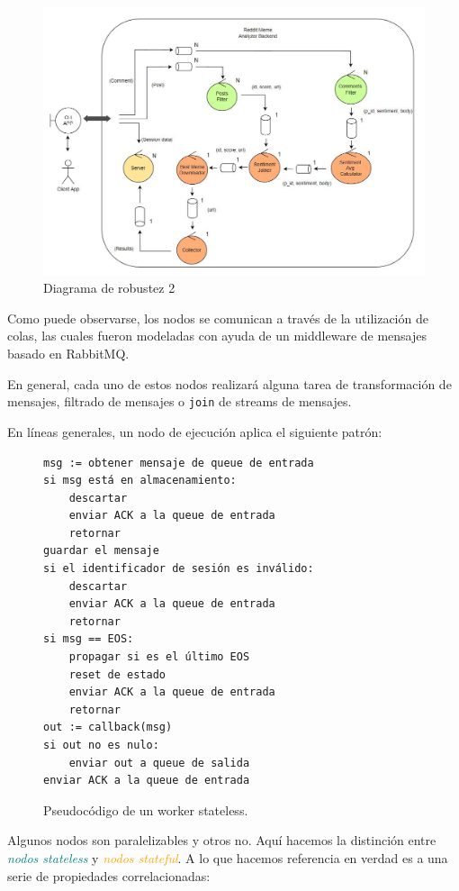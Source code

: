 \documentclass[titlepage,a4paper,oneside]{article}
\begin{document}
\begin{figure}[H]
	\centering
	\includegraphics[width=11.5cm]{img/robustez_2.JPG}
	\caption{Diagrama de robustez 2}
\end{figure}

Como puede observarse, los nodos se comunican a través de la utilización de colas, las cuales fueron modeladas con ayuda de un middleware de mensajes basado en RabbitMQ.

En general, cada uno de estos nodos realizará alguna tarea de transformación de mensajes, filtrado de mensajes o \texttt{join} de streams de mensajes.

En líneas generales, un nodo de ejecución aplica el siguiente patrón:

\begin{figure}[H]
\begin{verbatim}
msg := obtener mensaje de queue de entrada
si msg está en almacenamiento:
    descartar
    enviar ACK a la queue de entrada
    retornar
guardar el mensaje
si el identificador de sesión es inválido:
    descartar
    enviar ACK a la queue de entrada
    retornar
si msg == EOS:
    propagar si es el último EOS
    reset de estado
    enviar ACK a la queue de entrada
    retornar
out := callback(msg)
si out no es nulo:
    enviar out a queue de salida
enviar ACK a la queue de entrada
\end{verbatim}
\caption{Pseudocódigo de un worker stateless.}
\end{figure}

Algunos nodos son paralelizables y otros no. Aquí hacemos la distinción entre \textcolor{teal}{\textit{nodos stateless}} y \textcolor{orange}{\textit{nodos stateful}}. A lo que hacemos referencia en verdad es a una serie de propiedades correlacionadas:
\end{document}
